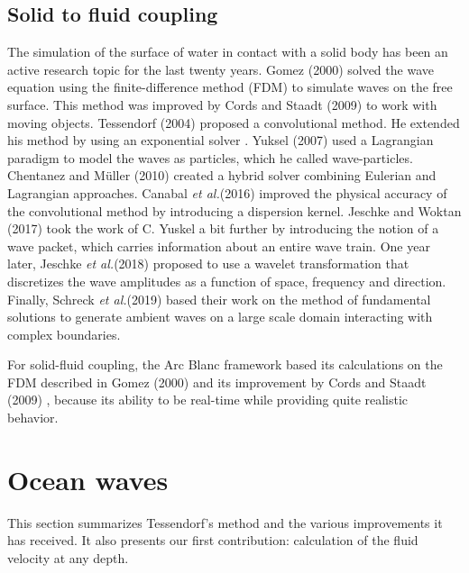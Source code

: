 \documentclass[11pt]{article}
\def\framework{the Arc Blanc framework\xspace}
\def\etal{\emph{et al.}\xspace}
\begin{document}
\subsection{Solid to fluid coupling}
\label{subsubsec:solidToFluidCoupling}
The simulation of the surface of water in contact with a solid body has been an active research topic for the last twenty years.
Gomez (2000) \cite{gomezInteractiveSimulationWater2000} solved the wave equation using the finite-difference method (FDM) to simulate waves on the free surface.
This method was improved by Cords and Staadt (2009) \cite{cordsRealTimeOpenWater2009} to work with moving objects.
Tessendorf (2004) \cite{tessendorfInteractiveWaterSurface2004} proposed a convolutional method.
He extended his method by using an exponential solver \cite{tessendorfEWaveUsingExponential2014}.
Yuksel (2007) \cite{yukselWaveParticles2007} used a Lagrangian paradigm to model the waves as particles, which he called wave-particles.
Chentanez and Müller (2010) \cite{chentanezRealTimeSimulationLarge2010} created a hybrid solver combining Eulerian and Lagrangian approaches.
Canabal \etal (2016) \cite{canabalDispersionKernelsWater2016} improved the physical accuracy of the convolutional method by introducing a dispersion kernel.
Jeschke and Woktan (2017) \cite{jeschkeWaterWavePackets2017} took the work of C. Yuskel a bit further by introducing the notion of a wave packet, which carries information about an entire wave train.
One year later, Jeschke \etal (2018) \cite{jeschkeWaterSurfaceWavelets2018} proposed to use a wavelet transformation that discretizes the wave amplitudes as a function of space, frequency and direction.
Finally, Schreck \etal (2019) \cite{schreckFundamentalSolutionsWater2019} based their work on the method of fundamental solutions to generate ambient waves on a large scale domain interacting with complex boundaries.

For solid-fluid coupling, \framework based its calculations on the FDM described in Gomez (2000) \cite{gomezInteractiveSimulationWater2000} and its improvement by Cords and Staadt (2009) \cite{cordsRealTimeOpenWater2009}, because its ability to be real-time while providing quite realistic behavior.

\section{Ocean waves}
\label{sec:oceanWaves}
This section summarizes Tessendorf's method and the various improvements it has received.
It also presents our first contribution: calculation of the fluid velocity at any depth.
\end{document}

